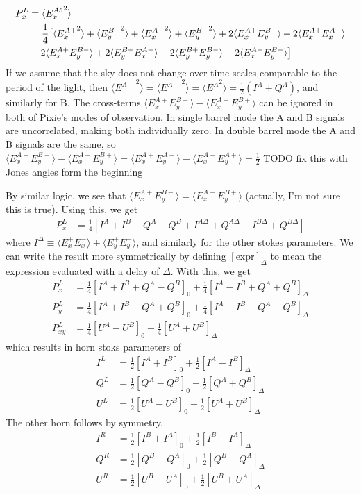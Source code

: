 \documentclass{article}
\begin{document}
\begin{align}
	P^L_x &= \langle {E^{A5}_x}^2\rangle \notag \\
		&= \frac14\big[
			\langle {E^{A+}_x}^2\rangle
			+ \langle {E^{B+}_y}^2\rangle
			+ \langle {E^{A-}_x}^2\rangle
			+ \langle {E^{B-}_y}^2\rangle
			+ 2\langle E^{A+}_xE^{B+}_y\rangle
			+ 2\langle E^{A+}_xE^{A-}_x\rangle \notag \\
			&- 2\langle E^{A+}_xE^{B-}_y\rangle
			+ 2\langle E^{B+}_yE^{A-}_x\rangle
			- 2\langle E^{B+}_yE^{B-}_y\rangle
			- 2\langle E^{A-}_xE^{B-}_y\rangle
			\big]
\end{align}
If we assume that the sky does not change over time-scales
comparable to the period of the light, then $\langle {E^{A+}}^2\rangle
= \langle {E^{A-}}^2\rangle = \langle {E^A}^2\rangle = \frac12(I^A+Q^A)$,
and similarly for B. The cross-terms $\langle E^{A+}_xE^{B-}_y\rangle
-\langle E^{A-}_xE^{B+}_y\rangle$ can be ignored in both of Pixie's modes of
observation. In single barrel mode the A and B signals are uncorrelated,
making both individually zero. In double barrel mode the A and B signals are
the same, so $\langle E^{A+}_xE^{B-}_y\rangle
-\langle E^{A-}_xE^{B+}_y\rangle = \langle E^{A+}_xE^{A-}_y\rangle
-\langle E^{A-}_xE^{A+}_y\rangle = \frac12$ TODO fix this with
Jones angles form the beginning

By similar logic, we see that $\langle E^{A+}_xE^{B-}_y\rangle = \langle E^{A-}_xE^{B+}_y\rangle$ (actually, I'm not sure this is true). Using this, we get
\begin{align}
	P^L_x &= \frac14 [I^A+I^B+Q^A-Q^B + I^{A\Delta}+Q^{A\Delta}-I^{B\Delta}+Q^{B\Delta}]
\end{align}
where $I^\Delta \equiv \langle E^+_xE^-_x\rangle +\langle E^+_yE^-_y\rangle$, and similarly for the
other stokes parameters. We can write the result more symmetrically by
defining $[\textrm{expr}]_\Delta$ to mean the expression evaluated with
a delay of $\Delta$. With this, we get
\begin{align}
	P^L_x &= \frac14 [I^A+I^B+Q^A-Q^B]_0 + \frac14[I^A-I^B+Q^A+Q^B]_\Delta \\
	P^L_y &= \frac14 [I^A+I^B-Q^A+Q^B]_0 + \frac14[I^A-I^B-Q^A-Q^B]_\Delta \\
	P^L_{xy} &= \frac14 [U^A-U^B]_0 + \frac14[U^A+U^B]_\Delta
\end{align}
which results in horn stoks parameters of
\begin{align}
	I^L &= \frac12 [I^A+I^B]_0 + \frac12[I^A-I^B]_\Delta \\
	Q^L &= \frac12 [Q^A-Q^B]_0 + \frac12[Q^A+Q^B]_\Delta \\
	U^L &= \frac12 [U^A-U^B]_0 + \frac12[U^A+U^B]_\Delta
\end{align}
The other horn follows by symmetry.
\begin{align}
	I^R &= \frac12 [I^B+I^A]_0 + \frac12[I^B-I^A]_\Delta \\
	Q^R &= \frac12 [Q^B-Q^A]_0 + \frac12[Q^B+Q^A]_\Delta \\
	U^R &= \frac12 [U^B-U^A]_0 + \frac12[U^B+U^A]_\Delta
\end{align}
\end{document}
